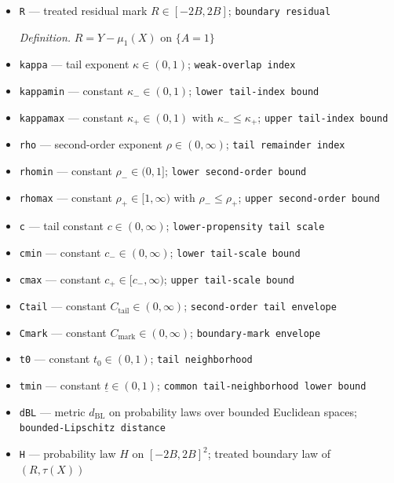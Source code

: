 \documentclass{article}
\begin{document}
\begin{itemize}
  \par\smallskip\noindent\emph{Definition.} \(\tau(x)=\mu_1(x)-\mu_0(x)\)
  \item \texttt{R} --- treated residual mark \(R\in[-2B,2B]\); \texttt{boundary residual}
  \par\smallskip\noindent\emph{Definition.} \(R=Y-\mu_1(X)\) on \(\{A=1\}\)
  \item \texttt{kappa} --- tail exponent \(\kappa\in(0,1)\); \texttt{weak-\allowbreak{}overlap index}
  \item \texttt{kappamin} --- constant \(\kappa_-\in(0,1)\); \texttt{lower tail-\allowbreak{}index bound}
  \item \texttt{kappamax} --- constant \(\kappa_+\in(0,1)\) with \(\kappa_-\leq\kappa_+\); \texttt{upper tail-\allowbreak{}index bound}
  \item \texttt{rho} --- second-order exponent \(\rho\in(0,\infty)\); \texttt{tail remainder index}
  \item \texttt{rhomin} --- constant \(\rho_-\in(0,1]\); \texttt{lower second-\allowbreak{}order bound}
  \item \texttt{rhomax} --- constant \(\rho_+\in[1,\infty)\) with \(\rho_-\leq\rho_+\); \texttt{upper second-\allowbreak{}order bound}
  \item \texttt{c} --- tail constant \(c\in(0,\infty)\); \texttt{lower-\allowbreak{}propensity tail scale}
  \item \texttt{cmin} --- constant \(c_-\in(0,\infty)\); \texttt{lower tail-\allowbreak{}scale bound}
  \item \texttt{cmax} --- constant \(c_+\in[c_-,\infty)\); \texttt{upper tail-\allowbreak{}scale bound}
  \item \texttt{Ctail} --- constant \(C_{\mathrm{tail}}\in(0,\infty)\); \texttt{second-\allowbreak{}order tail envelope}
  \item \texttt{Cmark} --- constant \(C_{\mathrm{mark}}\in(0,\infty)\); \texttt{boundary-\allowbreak{}mark envelope}
  \item \texttt{t0} --- constant \(t_0\in(0,1)\); \texttt{tail neighborhood}
  \item \texttt{tmin} --- constant \(\underline t\in(0,1)\); \texttt{common tail-\allowbreak{}neighborhood lower bound}
  \item \texttt{dBL} --- metric \(d_{\mathrm{BL}}\) on probability laws over bounded Euclidean spaces; \texttt{bounded-\allowbreak{}Lipschitz distance}
  \item \texttt{H} --- probability law \(H\) on \([-2B,2B]^2\); treated boundary law of \((R,\tau(X))\)

\end{itemize}
\end{document}
